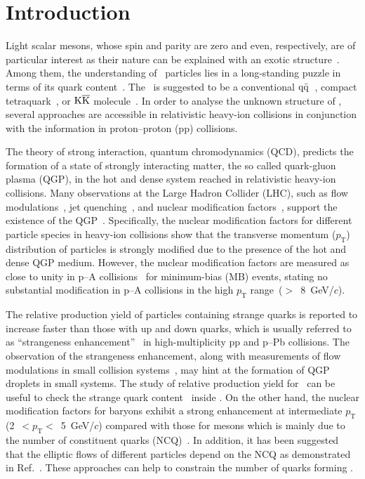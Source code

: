 
\section{Introduction}

Light scalar mesons, whose spin and parity are zero and even, respectively, are of particular interest as their nature can be explained with an exotic structure~\cite{ParticleDataGroup:2022pth}. Among them, the understanding of \fzero\ particles lies in a long-standing puzzle in terms of its quark content~\cite{ExHIC:2010gcb, Jaffe:1976ig, Maiani:2004uc}. The \fzero\ is suggested to be a conventional $\rm{}q\bar{q}$~\cite{Chen:2003za}, compact tetraquark~\cite{Achasov:2020aun}, or $\rm{}K\overline{K}$ molecule~\cite{Ahmed:2020kmp}. In order to analyse the unknown structure of \fzero, several approaches are accessible in relativistic heavy-ion collisions in conjunction with the information in proton--proton (pp) collisions. 

The theory of strong interaction, quantum chromodynamics (QCD), predicts the formation of a state of strongly interacting matter, the so called quark-gluon plasma (QGP), in the hot and dense system reached in relativistic heavy-ion collisions. Many observations at the Large Hadron Collider (LHC), such as flow modulations~\cite{Bhalerao:2020ulk, ALICE:2019zfl}, jet quenching~\cite{ALICE:2019qyj}, and nuclear modification factors~\cite{ALICE:2019hno}, support the existence of the QGP~\cite{Adams:2005dq}. Specifically, the nuclear modification factors for different particle species in heavy-ion collisions show that the transverse momentum ($p_{\mathrm{T}}$) distribution of particles is strongly modified due to the presence of the hot and dense QGP medium. However, the nuclear modification factors are measured as close to unity in p--A collisions~\cite{ALICE:2016dei} for minimum-bias (MB) events, stating no substantial modification in p--A collisions in the high $p_{\mathrm{T}}$ range~($>$~8~GeV/$c$). 

The relative production yield of particles containing strange quarks is reported to increase faster than those with up and down quarks, which is usually referred to as ``strangeness enhancement''~\cite{ALICE:2016fzo} in high-multiplicity pp and p--Pb collisions. The observation of the strangeness enhancement, along with measurements of flow modulations in small collision systems~\cite{PHENIX:2018lia, ALICE:2021nir}, may hint at the formation of QGP droplets in small systems. The study of relative production yield for \fzero\ can be useful to check the strange quark content~\cite{LHCb:2014ooi, LHCb:2014vbo} inside \fzero. On the other hand, the nuclear modification factors for baryons exhibit a strong enhancement at intermediate $p_{\mathrm{T}}$ (2~$<p_{\mathrm{T}}<$~5~GeV/$c$) compared with those for mesons which is mainly due to the number of constituent quarks (NCQ)~\cite{Cronin:1974zm, Fries:2003vb}. In addition, it has been suggested that the elliptic flows of different particles depend on the NCQ as demonstrated in Ref.~\cite{Wang:2022det}. These approaches can help to constrain the number of quarks forming \fzero.

